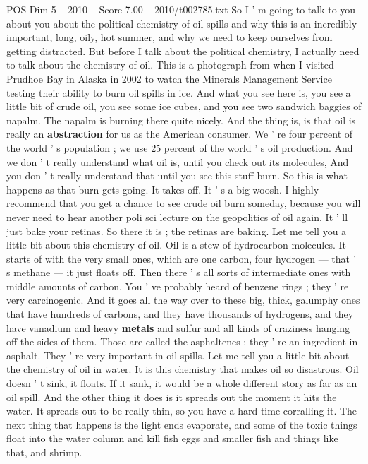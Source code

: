 \begin{textsample}{POS Dim 5 – 2010 – Score 7.00 – 2010/t002785.txt}  \label{ex:f5_pos_030}
So I ' m going to talk to you about you about the political chemistry of oil spills and why this is an incredibly important, long, oily, hot summer, and why we need to keep ourselves from getting distracted.
But before I talk about the political chemistry, I actually need to talk about the chemistry of oil.
This is a photograph from when I visited Prudhoe Bay in Alaska in 2002 to watch the Minerals Management Service testing their ability to burn oil spills in ice.
And what you see here is, you see a little bit of crude oil, you see some ice cubes, and you see two sandwich baggies of napalm.
The napalm is burning there quite nicely.
And the thing is, is that oil is really an \textbf{abstraction} for us as the American consumer.
We ' re four percent of the world ' s population ; we use 25 percent of the world ' s oil production.
And we don ' t really understand what oil is, until you check out its molecules, And you don ' t really understand that until you see this stuff burn.
So this is what happens as that burn gets going.
It takes off.
It ' s a big woosh.
I highly recommend that you get a chance to see crude oil burn someday, because you will never need to hear another poli sci lecture on the geopolitics of oil again.
It ' ll just bake your retinas.
So there it is ; the retinas are baking.
Let me tell you a little bit about this chemistry of oil.
Oil is a stew of hydrocarbon molecules.
It starts of with the very small ones, which are one carbon, four hydrogen — that ' s methane — it just floats off.
Then there ' s all sorts of intermediate ones with middle amounts of carbon.
You ' ve probably heard of benzene rings ; they ' re very carcinogenic.
And it goes all the way over to these big, thick, galumphy ones that have hundreds of carbons, and they have thousands of hydrogens, and they have vanadium and heavy \textbf{metals} and sulfur and all kinds of craziness hanging off the sides of them.
Those are called the asphaltenes ; they ' re an ingredient in asphalt.
They ' re very important in oil spills.
Let me tell you a little bit about the chemistry of oil in water.
It is this chemistry that makes oil so disastrous.
Oil doesn ' t sink, it floats.
If it sank, it would be a whole different story as far as an oil spill.
And the other thing it does is it spreads out the moment it hits the water.
It spreads out to be really thin, so you have a hard time corralling it.
The next thing that happens is the light ends evaporate, and some of the toxic things float into the water column and kill fish eggs and smaller fish and things like that, and shrimp.

\end{textsample}
